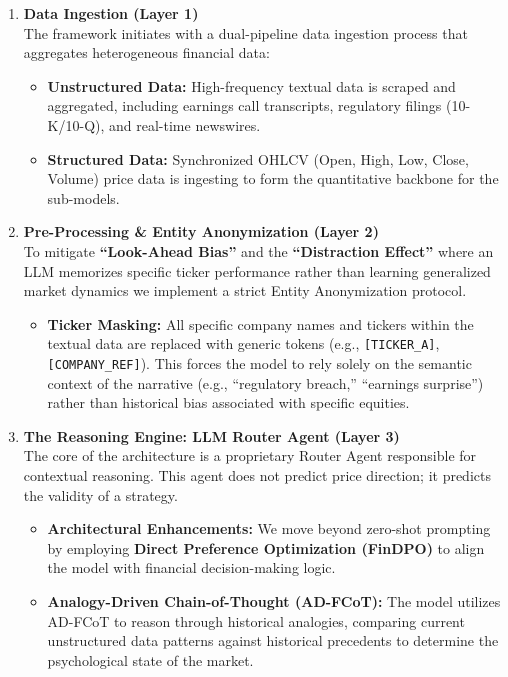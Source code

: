 \documentclass[12pt, a4paper]{report}
\begin{document}
\begin{enumerate}
    \item \textbf{Data Ingestion (Layer 1)} \\
    The framework initiates with a dual-pipeline data ingestion process that aggregates heterogeneous financial data:
    \begin{itemize}
        \item \textbf{Unstructured Data:} High-frequency textual data is scraped and aggregated, including earnings call transcripts, regulatory filings (10-K/10-Q), and real-time newswires.
        \item \textbf{Structured Data:} Synchronized OHLCV (Open, High, Low, Close, Volume) price data is ingesting to form the quantitative backbone for the sub-models.
    \end{itemize}

    \item \textbf{Pre-Processing \& Entity Anonymization (Layer 2)} \\
    To mitigate \textbf{``Look-Ahead Bias''} and the \textbf{``Distraction Effect''} where an LLM memorizes specific ticker performance rather than learning generalized market dynamics we implement a strict Entity Anonymization protocol.
    \begin{itemize}
        \item \textbf{Ticker Masking:} All specific company names and tickers within the textual data are replaced with generic tokens (e.g., \texttt{[TICKER\_A]}, \texttt{[COMPANY\_REF]}). This forces the model to rely solely on the semantic context of the narrative (e.g., ``regulatory breach,'' ``earnings surprise'') rather than historical bias associated with specific equities.
    \end{itemize}

    \item \textbf{The Reasoning Engine: LLM Router Agent (Layer 3)} \\
    The core of the architecture is a proprietary Router Agent responsible for contextual reasoning. This agent does not predict price direction; it predicts the validity of a strategy.
    \begin{itemize}
        \item \textbf{Architectural Enhancements:} We move beyond zero-shot prompting by employing \textbf{Direct Preference Optimization (FinDPO)} to align the model with financial decision-making logic.
        \item \textbf{Analogy-Driven Chain-of-Thought (AD-FCoT):} The model utilizes AD-FCoT to reason through historical analogies, comparing current unstructured data patterns against historical precedents to determine the psychological state of the market.
    \end{itemize}


\end{enumerate}
\end{document}
